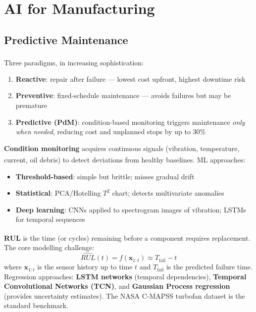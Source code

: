 \section{AI for Manufacturing}

\subsection{Predictive Maintenance}

\begin{tcbitemize}[ skin=sectionraster ]
    \tcbitem[title={Maintenance Strategies}, raster multicolumn=3]
    Three paradigms, in increasing sophistication\textsuperscript{\cite[][pp.~1--3]{leeSurveyPredictiveMaintenance2019}}:
    \begin{enumerate}
        \item \textbf{Reactive}: repair after failure — lowest cost upfront, highest downtime risk
        \item \textbf{Preventive}: fixed-schedule maintenance — avoids failures but may be premature
        \item \textbf{Predictive (PdM)}: condition-based monitoring triggers maintenance \emph{only when needed}, reducing cost and unplanned stops by up to 30\%
    \end{enumerate}

    \tcbitem[title={Condition Monitoring and Fault Detection}, raster multicolumn=3]
    \textbf{Condition monitoring} acquires continuous signals (vibration, temperature, current, oil debris) to detect deviations from healthy baselines\textsuperscript{\cite[][pp.~213--215]{zhaoDeepLearningFault2019}}.
    ML approaches:
    \begin{itemize}
        \item \textbf{Threshold-based}: simple but brittle; misses gradual drift
        \item \textbf{Statistical}: PCA/Hotelling $T^2$ chart; detects multivariate anomalies
        \item \textbf{Deep learning}: CNNs applied to spectrogram images of vibration; LSTMs for temporal sequences
    \end{itemize}

    \tcbitem[title={Remaining Useful Life (RUL) Estimation}, raster multicolumn=6]
    \textbf{RUL} is the time (or cycles) remaining before a component requires replacement\textsuperscript{\cite[][pp.~215--220]{zhaoDeepLearningFault2019}}.
    The core modelling challenge:
    \begin{equation}
        \hat{RUL}(t) = f\!\left(\mathbf{x}_{1:t}\right) \approx T_{\text{fail}} - t
    \end{equation}
    where $\mathbf{x}_{1:t}$ is the sensor history up to time $t$ and $T_{\text{fail}}$ is the predicted failure time.
    Regression approaches: \textbf{LSTM networks} (temporal dependencies), \textbf{Temporal Convolutional Networks (TCN)}, and \textbf{Gaussian Process regression} (provides uncertainty estimates).
    The NASA C-MAPSS turbofan dataset is the standard benchmark.
\end{tcbitemize}

